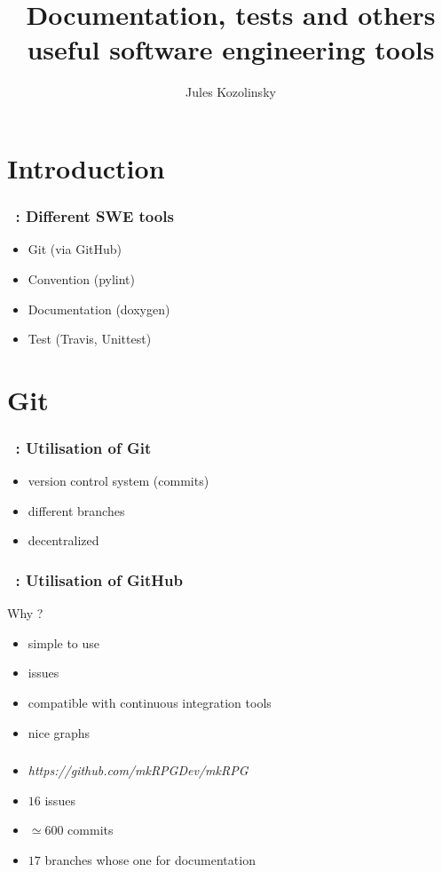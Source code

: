 \documentclass[a4paper, 11pt]{beamer}
\author{Jules Kozolinsky}
\title{Documentation, tests and others useful software engineering tools }
\date{}
\institute{ENS Paris-Saclay}
\begin{document}
\begin{frame}
    \titlepage
\end{frame}

\section*{Introduction}

\begin{frame}
    \frametitle{\secname~: Different SWE tools}
    \begin{itemize}
        \item Git (via GitHub)
        \item Convention (pylint)
        \item Documentation (doxygen)
        \item Test (Travis, Unittest)
    \end{itemize}
\end{frame}

\section{Git}

\begin{frame}
    \frametitle{\secname~: Utilisation of Git}
    \begin{itemize}
        \item version control system (commits)
        \item different branches 
        \item decentralized
    \end{itemize}
\end{frame}

\begin{frame}
    \frametitle{\secname~: Utilisation of GitHub}
    Why ?
    \begin{itemize}
        \item simple to use
        \item issues
        \item compatible with continuous integration tools 
        \item nice graphs 
    \end{itemize}
\end{frame}

\begin{frame}
    \frametitle{\secname}
    \begin{itemize}
    	\item \textit{https://github.com/mkRPGDev/mkRPG}
        \item $16$ issues
        \item $\simeq 600$ commits
        \item $17$ branches whose one for documentation
    \end{itemize}
\end{frame}
\end{document}
